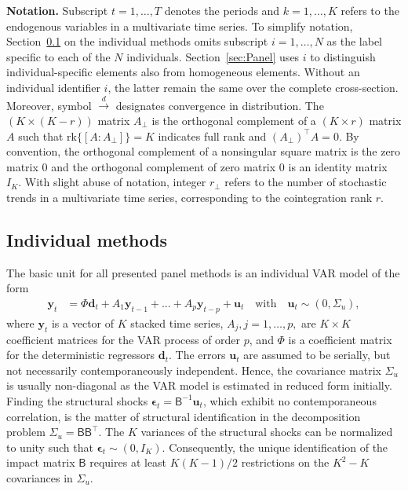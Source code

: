 \textbf{Notation.} Subscript $ t = 1, \ldots, T $ denotes the periods and $ k = 1, \ldots, K $ refers to the endogenous variables in a multivariate time series. To simplify notation, Section~\ref{sec:Indiv} on the individual methods omits subscript $ i = 1, \ldots, N $ as the label specific to each of the $ N $ individuals. Section~\ref{sec:Panel} uses $ i $ to distinguish individual-specific elements also from homogeneous elements. Without an individual identifier $ i $, the latter remain the same over the complete cross-section. Moreover, symbol $ \overset{d}{\longrightarrow} $ designates convergence in distribution. The $ (K \times (K-r)) $ matrix $ A_\perp $ is the orthogonal complement of a $ (K \times r) $ matrix $ A $ such that $ \text{rk} \lbrace [A : A_\perp] \rbrace = K $ indicates full rank and $ \left( A_\perp \right)^\top A=0 $. By convention, the orthogonal complement of a nonsingular square matrix is the zero matrix $ 0 $ and the orthogonal complement of zero matrix $ 0 $ is an identity matrix $ I_K $. With slight abuse of notation, integer $ r_\perp $ refers to the number of stochastic trends in a multivariate time series, corresponding to the cointegration rank $ r $.


\subsection{Individual methods} \label{sec:Indiv}
The basic unit for all presented panel methods is an individual VAR model of the form 
\begin{align} \label{eq:VAR}
	\boldsymbol{y}_{t} &= \Phi \boldsymbol{d}_{t} + A_1 \boldsymbol{y}_{t-1} + ... + A_p \boldsymbol{y}_{t-p} + \boldsymbol{u}_{t} \quad \textrm{with} \quad \boldsymbol{u}_{t} \sim (0,\Sigma_u) ,
\end{align}
where $\boldsymbol{y}_{t}$ is a vector of $ K $ stacked time series, $A_j, j=1,\ldots,p,$ are $ K \times K $ coefficient matrices for the VAR process of order $p$, and $ \Phi $ is a coefficient matrix for the deterministic regressors $ \boldsymbol{d}_{t} $. The errors $ \boldsymbol{u}_{t} $ are assumed to be serially, but not necessarily contemporaneously independent. Hence, the covariance matrix $ \Sigma_u $ is usually non-diagonal as the VAR model is estimated in reduced form initially. Finding the structural shocks $ \boldsymbol{\epsilon}_{t} = \mathsf{B}^{-1} \boldsymbol{u}_{t} $, which exhibit no contemporaneous correlation, is the matter of structural identification in the decomposition problem $ \Sigma_u = \mathsf{B} \mathsf{B}^\top $. The $ K $ variances of the structural shocks can be normalized to unity such that $ \boldsymbol{\epsilon}_{t} \sim ( 0, I_K ) $. Consequently, the unique identification of the impact matrix $ \mathsf{B}$ requires at least $ K(K-1)/2 $ restrictions on the $ K^2-K $ covariances in $ \Sigma_u $.

